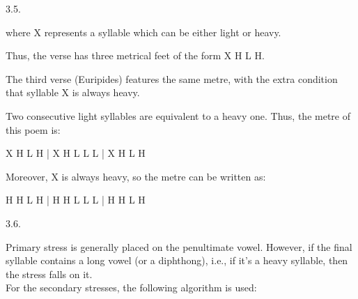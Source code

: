 \begin{refsection}
\begin{practiceproblemsolution}{3.5. \langnameAncientGreek}
\begin{solutions}[label=Solution 3.5\alph*]
\begin{itemize}
\noindent where X represents a syllable which can be either light or heavy.

Thus, the verse has three metrical feet of the form X H L H.
\end{itemize}

    \item The third verse (Euripides) features the same metre, with the extra condition that syllable X is always heavy.
    \item Two consecutive light syllables are equivalent to a heavy one. Thus, the metre of this poem is:
            \begin{center}
            X H L H | X H L L L | X H L H
            \end{center}
    \item[] Moreover, X is always heavy, so the metre can be written as:
            \begin{center}
            H H L H | H H L L L | H H L H
            \end{center}
\end{solutions}
\end{practiceproblemsolution}


\begin{practiceproblemsolution}{3.6. \langnameFijian}

\begin{solutions}[label=Solution 3.6\alph*]
    \item
    \begin{itemize}

    \begin{multicols}{3}
        \item[] 
        \item[] 
        \item[] 
        \item[] 
        \item[] 
        \item[] 
    \end{multicols}
    \end{itemize}
    \item Primary stress is generally placed on the penultimate vowel. However, if the final syllable contains a long vowel (or a diphthong), i.e., if it's a heavy syllable, then the stress falls on it. \\
For the secondary stresses, the following algorithm is used:
\begin{enumerate}


\end{enumerate}
\end{solutions}
\end{practiceproblemsolution}
\end{refsection}
